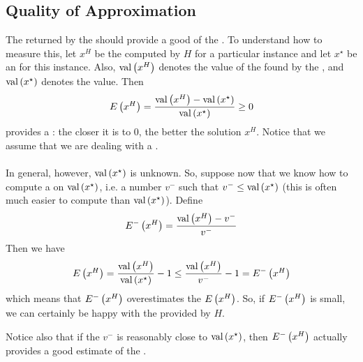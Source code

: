 \subsection{Quality of Approximation}
The  returned by the  should provide a good  of the . To understand how to measure this, let $x^H$ be the  computed by  $H$ for a particular instance and let $x^{\star}$ be an  for this instance. Also, $\mbox{val}\left( x^H \right)$ denotes the value of the  found by the , and $\mbox{val}\left( x^{\star} \right)$ denotes the  value. Then
\begin{equation}
E\left( x^H \right)=\displaystyle\frac{\mbox{val}\left( x^H \right)-\mbox{val}\left( x^{\star} \right)}{\mbox{val}\left( x^{\star} \right)}\geq 0
\end{equation}
provides a : the closer it is to $0$, the better the solution $x^H$. Notice that we assume that we are dealing with a .

\paragraph{}
In general, however, $\mbox{val}\left( x^{\star} \right)$ is unknown. So, suppose now that we know how to compute a  on $\mbox{val}\left( x^{\star} \right)$, i.e. a number $v^-$ such that $v^-\leq\mbox{val}\left( x^{\star} \right)$ (this is often much easier to compute than $\mbox{val}\left( x^{\star} \right)$). Define
\begin{equation}
E^-\left( x^H \right)=\displaystyle\frac{\mbox{val}\left( x^H \right)-v^-}{v^-}
\end{equation}
Then we have
\begin{equation}
E\left( x^H \right)=\displaystyle\frac{\mbox{val}\left( x^H \right)}{\mbox{val}\left( x^{\star} \right)}-1\leq\displaystyle\frac{\mbox{val}\left( x^H \right)}{v^-}-1=E^-\left( x^H \right)
\end{equation}
which means that $E^-\left( x^H \right)$ overestimates the  $E\left( x^H \right)$. So, if $E^-\left( x^H \right)$ is small, we can certainly be happy with the  provided by $H$.
\begin{note}
Notice also that if the  $v^-$ is reasonably close to $\mbox{val}\left( x^{\star} \right)$, then $E^-\left( x^H \right)$ actually provides a good estimate of the .
\end{note}

